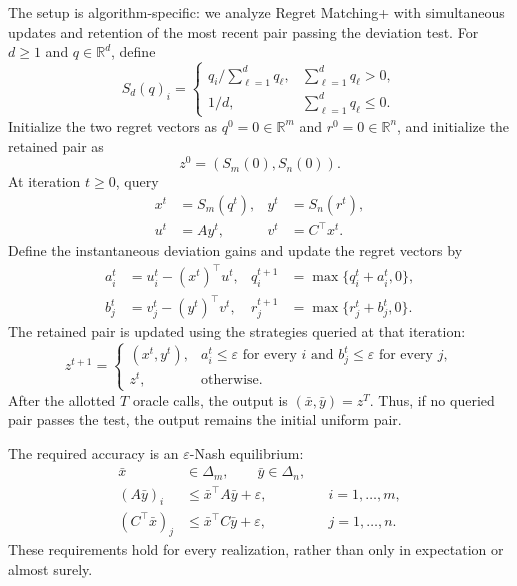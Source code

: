 \documentclass[10pt]{article}
\theoremstyle{definition}
\begin{document}
The setup is algorithm-specific: we analyze Regret Matching+ with simultaneous updates and retention of the most recent pair passing the deviation test. For $d\geq 1$ and $q\in\mathbb{R}^d$, define
\[
S_d(q)_i=
\begin{cases}
q_i\big/\sum_{\ell=1}^d q_\ell,&\displaystyle\sum_{\ell=1}^d q_\ell>0,\\
1/d,&\displaystyle\sum_{\ell=1}^d q_\ell\leq 0.
\end{cases}
\]
Initialize the two regret vectors as $q^0=0\in\mathbb{R}^m$ and $r^0=0\in\mathbb{R}^n$, and initialize the retained pair as
\[
z^0=(S_m(0),S_n(0)).
\]
At iteration $t\geq 0$, query
\[
\begin{aligned}
x^t&=S_m(q^t), & y^t&=S_n(r^t),\\
u^t&=Ay^t, & v^t&=C^\top x^t.
\end{aligned}
\]
Define the instantaneous deviation gains and update the regret vectors by
\[
\begin{aligned}
a_i^t&=u_i^t-(x^t)^\top u^t,
& q_i^{t+1}&=\max\{q_i^t+a_i^t,0\},\\
b_j^t&=v_j^t-(y^t)^\top v^t,
& r_j^{t+1}&=\max\{r_j^t+b_j^t,0\}.
\end{aligned}
\]
The retained pair is updated using the strategies queried at that iteration:
\[
z^{t+1}=
\begin{cases}
(x^t,y^t),& a_i^t\leq\varepsilon\text{ for every }i
\text{ and }b_j^t\leq\varepsilon\text{ for every }j,\\
z^t,&\text{otherwise}.
\end{cases}
\]
After the allotted $T$ oracle calls, the output is $(\bar{x},\bar{y})=z^T$. Thus, if no queried pair passes the test, the output remains the initial uniform pair.

The required accuracy is an $\varepsilon$-Nash equilibrium:
\[
\begin{aligned}
\bar{x}&\in\Delta_m,\qquad \bar{y}\in\Delta_n,\\
(A\bar{y})_i&\leq\bar{x}^\top A\bar{y}+\varepsilon,
&&i=1,\ldots,m,\\
(C^\top\bar{x})_j&\leq\bar{x}^\top C\bar{y}+\varepsilon,
&&j=1,\ldots,n.
\end{aligned}
\]
These requirements hold for every realization, rather than only in expectation or almost surely.
\end{document}
